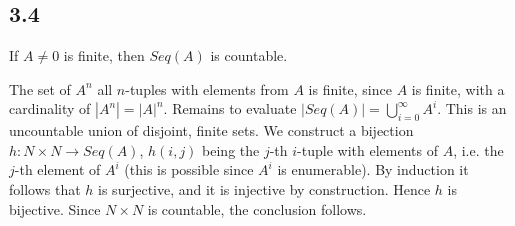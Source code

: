 \subsection*{3.4} If $A \neq 0$ is finite, then $Seq(A)$ is countable.

The set of $A^n$ all $n$-tuples with elements from $A$ is finite, since $A$ is finite, with a cardinality of $|A^n| = |A|^n$. Remains to evaluate $|Seq(A)| = \bigcup_{i=0}^\infty A^i$. This is an uncountable union of disjoint, finite sets. We construct a bijection $h: N\times N \rightarrow Seq(A)$, $h(i,j)$ being the $j$-th $i$-tuple with elements of $A$, i.e. the $j$-th element of $A^i$ (this is possible since $A^i$ is enumerable). By induction it follows that $h$ is surjective, and it is injective by construction. Hence $h$ is bijective. Since $N \times N$ is countable, the conclusion follows.

